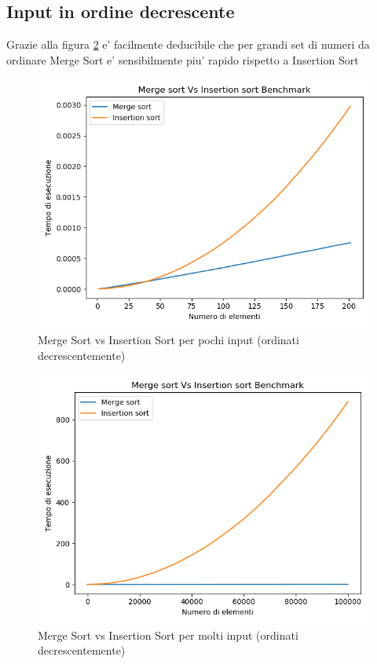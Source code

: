 \documentclass[a4paper]{article}
\begin{document}
\newpage		
\subsection{Input in ordine decrescente}
Grazie alla figura \ref{fig:BigInsMergeDecr} e' facilmente deducibile che per grandi set di numeri da ordinare Merge Sort  e' sensibilmente piu' rapido rispetto a Insertion Sort 
 
		\begin{figure}[!htb]
		\centering
		\includegraphics[scale=0.3]{4}
		\caption{Merge Sort vs Insertion Sort per pochi input (ordinati decrescentemente)}
		\label{fig:SmallInsMergeDecr}
		\end{figure}
		
		\begin{figure}[!htb]
		\centering
		\includegraphics[scale=0.3]{3}
		\caption{Merge Sort vs Insertion Sort per molti input (ordinati decrescentemente)}
		\label{fig:BigInsMergeDecr}
		\end{figure}
\newpage		
\end{document}
